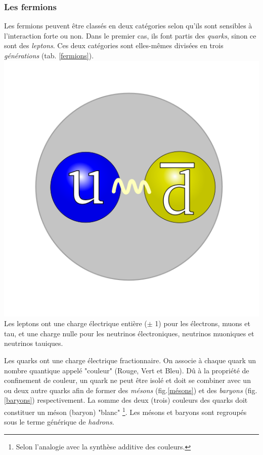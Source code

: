 \subsubsection{Les fermions}
Les fermions peuvent être classés en deux catégories selon qu'ils sont sensibles à l'interaction forte ou non. Dans le premier cas, ils font partis des \textit{quarks}, sinon ce sont des \textit{leptons}. Ces deux catégories sont elles-mêmes divisées en trois \textit{générations} (tab. \ref{fermions}).
\marginpar
{
\centering
\includegraphics[width=\marginparwidth]{SM/quarks2.png}
\label{mésons}
}
Les leptons ont une charge électrique entière ($\pm$ 1) pour les électrons, muons et tau, et une charge nulle pour les neutrinos électroniques, neutrinos muoniques et neutrinos tauiques.

Les quarks ont une charge électrique fractionnaire. On associe à chaque quark un nombre quantique appelé "couleur" (Rouge, Vert et Bleu). Dû à la propriété de confinement de couleur, un quark ne peut être isolé et doit se combiner avec un ou deux autre quarks afin de former des \textit{mésons} (fig.\ref{mésons}) et des \textit{baryons} (fig.\ref{baryons}) respectivement. La somme des deux (trois) couleurs des quarks doit constituer un méson (baryon) "blanc" \footnote{Selon l'analogie avec la synthèse additive des couleurs.}. Les mésons et baryons sont regroupés sous le terme générique de \textit{hadrons}.

